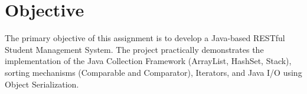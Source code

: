 \documentclass[12pt, a4paper]{article}
\begin{document}
                                                                                                                                                                           
    \section*{Objective}                                                                                                                                                   
    The primary objective of this assignment is to develop a Java-based RESTful Student Management System. The project practically demonstrates the implementation of the  
  Java Collection Framework (ArrayList, HashSet, Stack), sorting mechanisms (Comparable and Comparator), Iterators, and Java I/O using Object Serialization.               
                                                                                                                                                                           
\end{document}
